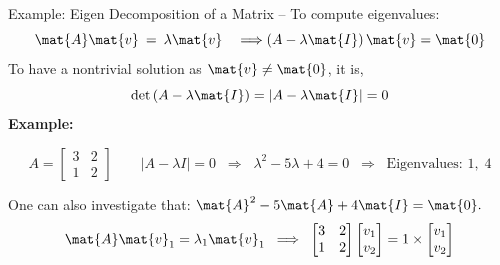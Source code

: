 \begin{frame}{Example: Eigen Decomposition of a Matrix --}
    To compute eigenvalues:
    \begin{equation*}
        \mat{A}\mat{v}\:=\:\lambda\mat{v} \quad \Longrightarrow \left(A-\lambda\mat{I}\right)\mat{v} = \mat{0}
    \end{equation*}
    To have a nontrivial solution as $\mat{v}\neq\mat{0}$, it is,
    \begin{equation*}
        \det\left(A-\lambda\mat{I}\right) = \left|A-\lambda\mat{I}\right| =0
    \end{equation*}
    \medskip
    \textbf{Example:}

    \[
        A =
        \begin{bmatrix}
            3 & 2 \\
            1 & 2
        \end{bmatrix}
        \qquad
        |A - \lambda I| = 0
        \;\;\Longrightarrow\;\;
        \lambda^{2} - 5\lambda + 4 = 0
        \;\;\Longrightarrow\;\;
        \text{Eigenvalues: } 1,\; 4
    \]

    One can also investigate that: $\mat{A}^{2} - 5\mat{A} + 4\mat{I} = \mat{0}.$
    \vfill
    \begin{equation*}
        \mat{A}\mat{v}_1=\lambda_1\mat{v}_1\;\;\Longrightarrow\;\;
        \begin{bmatrix}
            3 & 2 \\
            1 & 2
        \end{bmatrix} \begin{bmatrix}v_1\\v_2\end{bmatrix}  = 1\times
        \begin{bmatrix}v_1\\v_2\end{bmatrix}
    \end{equation*}


\end{frame}
